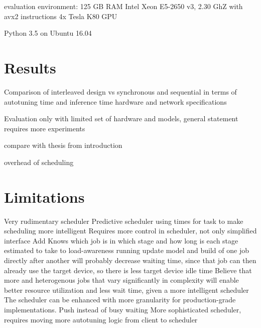 evaluation environment:
125 GB RAM
Intel Xeon E5-2650 v3, 2.30 GhZ with avx2 instructions
4x Tesla K80 GPU

Python 3.5
on Ubuntu 16.04

\section{Results}
Comparison of interleaved design vs synchronous and sequential in terms of autotuning time and inference time
hardware and network specifications

Evaluation only with limited set of hardware and models, general statement requires more experiments

compare with thesis from introduction

overhead of scheduling

\section{Limitations}
Very rudimentary scheduler
Predictive scheduler using times for task to make scheduling more intelligent
Requires more control in scheduler, not only simplified interface
Add Knows which job is in which stage and how long is each stage estimated to take to load-awareness
running update model and build of one job directly after another will probably decrease waiting time, since that job can then already use the target device, so there is less target device idle time
Believe that more and heterogenous jobs that vary significantly in complexity will enable better resource utilization and less wait time, given a more intelligent scheduler
The scheduler can be enhanced with more granularity for production-grade implementations.
Push instead of busy waiting
More sophisticated scheduler, requires moving more autotuning logic from client to scheduler